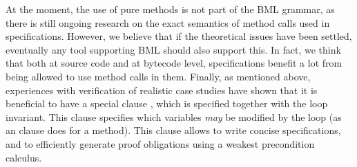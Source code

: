 At the moment, the use of pure methods is not part of the BML grammar,
as there is still ongoing research on the exact semantics of method
calls used in specifications. However, we believe that if the
theoretical issues have been settled, eventually any tool supporting
BML should also support this. In fact, we think that both at source
code and at bytecode level, specifications benefit a lot from being
allowed to use method calls in them. Finally, as mentioned above,
experiences with verification of realistic case studies have shown
that it is beneficial to have a special clause
, which is specified together with the loop
invariant. This clause specifies which variables
\emph{may} be modified by the loop (as an  clause does
for a method). This  clause allows to write
concise specifications, and to efficiently generate proof obligations
using a weakest precondition calculus.

